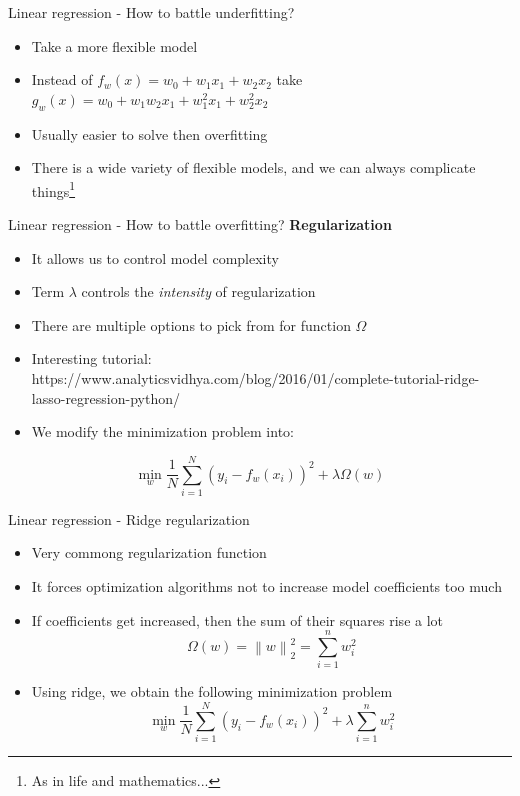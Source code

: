 \documentclass[aspectratio=169]{beamer}
\newcommand{\norm}[1]{\left\lVert#1\right\rVert}
\begin{document}
\begin{frame}{Linear regression - How to battle underfitting?}
    \begin{itemize}
        \item Take a more flexible model
        \item Instead of $f_w(x) = w_0 + w_1x_1 + w_2x_2$ take $g_w(x) = w_0 + w_1w_2x_1 + w_1^2x_1 + w_2^2x_2$
        \item Usually easier to solve then overfitting
        \item There is a wide variety of flexible models, and we can always complicate things\footnote{As in life and mathematics...}
    \end{itemize}
\end{frame}
\begin{frame}{Linear regression - How to battle overfitting?}
    \textbf{Regularization}
    \begin{itemize}
        \item It allows us to control model complexity
        \item Term $\lambda$ controls the \textit{intensity} of regularization
        \item There are multiple options to pick from for function $\Omega$
        \item Interesting tutorial: https://www.analyticsvidhya.com/blog/2016/01/complete-tutorial-ridge-lasso-regression-python/
        \item We modify the minimization problem into:
    \end{itemize}
    $$ \min_w \frac{1}{N} \sum_{i=1}^{N} (y_i - f_w(x_i))^ 2 + \lambda \Omega(w) $$
\end{frame}
\begin{frame}{Linear regression - Ridge regularization}
    \begin{itemize}
        \item Very commong regularization function
        \item It forces optimization algorithms not to increase model coefficients too much
        \item If coefficients get increased, then the sum of their squares rise a lot
        $$ \Omega(w) = \norm{w}_2^2 = \sum_{i=1}^{n}w_i^2 $$
    \item Using ridge, we obtain the following minimization problem
    $$ \min_w \frac{1}{N} \sum_{i=1}^{N} (y_i - f_w(x_i))^ 2 + \lambda \sum_{i=1}^{n}w_i^2 $$
    \end{itemize} 
\end{frame}
\end{document}
